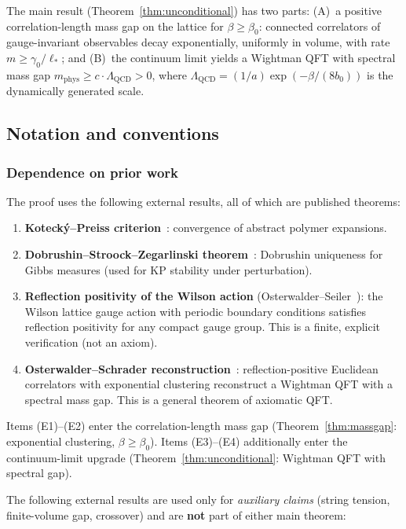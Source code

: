 \documentclass[11pt]{article}
\theoremstyle{definition}
\newcommand{\Lam}{\Lambda_{\mathrm{QCD}}}
\begin{document}
The main result (Theorem~\ref{thm:unconditional}) has two parts:
(A)~a positive correlation-length mass gap on the lattice for
$\beta\ge\beta_0$: connected correlators of gauge-invariant observables
decay exponentially, uniformly in volume, with rate
$m\ge\gamma_0/\ell_*$; and
(B)~the continuum limit yields a Wightman QFT with spectral
mass gap $m_{\mathrm{phys}}\ge c\cdot\Lam>0$, where
$\Lam=(1/a)\exp(-\beta/(8b_0))$ is the dynamically generated scale.

\subsection{Notation and conventions}

\subsubsection*{Dependence on prior work}

The proof uses the following external results, all of which are
published theorems:

\begin{enumerate}[nosep,label=(E\arabic*)]
\item \textbf{Koteck\'y--Preiss criterion}~\cite{KP}: convergence of
abstract polymer expansions.
\item \textbf{Dobrushin--Stroock--Zegarlinski
theorem}~\cite{StroockZegarlinski}: Dobrushin uniqueness
for Gibbs measures (used for KP stability under perturbation).
\item \textbf{Reflection positivity of the Wilson action}
(Osterwalder--Seiler~\cite{OS78}): the Wilson lattice gauge
action with periodic boundary conditions satisfies reflection
positivity for any compact gauge group.  This is a finite,
explicit verification (not an axiom).
\item \textbf{Osterwalder--Schrader reconstruction}~\cite{OS73}:
reflection-positive Euclidean correlators with exponential
clustering reconstruct a Wightman QFT with a spectral
mass gap.  This is a general theorem of axiomatic QFT.
\end{enumerate}

\noindent Items (E1)--(E2) enter the correlation-length mass gap
(Theorem~\ref{thm:massgap}: exponential clustering, $\beta\ge\beta_0$).
Items (E3)--(E4) additionally enter the continuum-limit upgrade
(Theorem~\ref{thm:unconditional}: Wightman QFT with spectral gap).

\noindent The following external results are used only for
\emph{auxiliary claims} (string tension, finite-volume gap,
crossover) and are \textbf{not} part of either main theorem:
\end{document}
